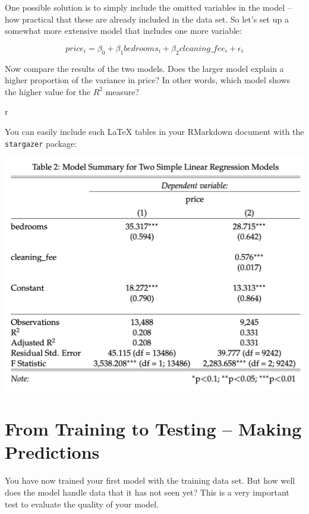 \documentclass[
  11pt,
]{book}
\begin{document}
One possible solution is to simply include the omitted variables in the
model -- how practical that these are already included in the data set.
So let's set up a somewhat more extensive model that includes one more
variable:

\[price_i = \beta_0 + \beta_1 bedrooms_i + \beta_2 cleaning\_fee_i + \epsilon_i\]

Now compare the results of the two models. Does the larger model explain
a higher proportion of the variance in price? In other words, which
model shows the higher value for the \(R^2\) measure?

\begin{tips}r

You can easily include such LaTeX tables in your RMarkdown document with
the \texttt{stargazer} package:

\begin{center}\includegraphics[width=1\linewidth]{plot/5_table} \end{center}

\end{tips}

\hypertarget{from-training-to-testing-making-predictions}{%
\section{From Training to Testing -- Making
Predictions}\label{from-training-to-testing-making-predictions}}

You have now trained your first model with the training data set. But
how well does the model handle data that it has not seen yet? This is a
very important test to evaluate the quality of your model.
\end{document}
